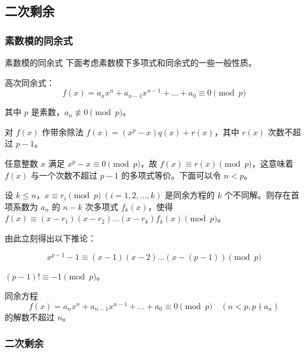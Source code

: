 \documentclass[../main.tex]{subfiles}
\begin{document}
\subsection{二次剩余}

\subsubsection{素数模的同余式}

\begin{frame}{素数模的同余式}
下面考虑素数模下多项式和同余式的一些一般性质。 \pause

高次同余式：
$$
f(x)=a_nx^n+a_{n-1}x^{n-1}+\dots+a_0\equiv 0\pmod p
$$

其中 $p$ 是素数，$a_{n}\not\equiv 0\pmod p$。 \pause

对 $f(x)$ 作带余除法 $f(x)=(x^p-x)q(x)+r(x)$，其中 $r(x)$ 次数不超过 $p-1$。 \pause

任意整数 $x$ 满足 $x^p-x\equiv 0\pmod p$，故 $f(x)\equiv r(x)\pmod p$，这意味着 $f(x)$ 与一个次数不超过 $p-1$ 的多项式等价。下面可以令 $n<p$。
\end{frame}

\begin{frame}
\begin{theo}[因式定理]
设 $k\le n$，$x\equiv r_i\pmod p \ (i=1,2,\dots,k)$ 是同余方程的 $k$ 个不同解。则存在首项系数为 $a_n$ 的 $n-k$ 次多项式 $f_k(x)$，使得 $f(x)\equiv (x-r_1)(x-r_2)\dots(x-r_k)f_k(x)\pmod p$。
\end{theo} \pause

由此立刻得出以下推论：

\begin{coro}[费马小定理的推论]
$$
x^{p-1}-1\equiv (x-1)(x-2)\dots(x-(p-1))\pmod p
$$
\end{coro}
\end{frame}

\begin{frame}
\begin{theo}[威尔逊定理]
$(p-1)!\equiv -1\pmod p$。
\end{theo} \pause

\begin{theo}[拉格朗日定理]
同余方程
$$
f(x)=a_nx^n+a_{n-1}x^{n-1}+\dots+a_0\equiv 0\pmod p\quad(n<p,p\nmid a_n)
$$
的解数不超过 $n$。
\end{theo}
\end{frame}

\subsubsection{二次剩余}
\end{document}
